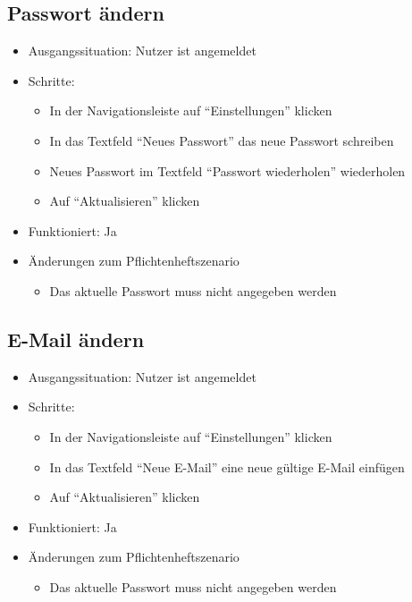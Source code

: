 \documentclass[a4paper]{scrreprt}
\begin{document}
            \subsection{Passwort ändern}
            \begin{itemize}
                \item Ausgangssituation: Nutzer ist angemeldet
                \item Schritte:
                    \begin{itemize}
                        \item In der Navigationsleiste auf \enquote{Einstellungen} klicken
                        \item In das Textfeld \enquote{Neues Passwort} das neue Passwort schreiben
                        \item Neues Passwort im Textfeld \enquote{Passwort wiederholen} wiederholen
                        \item Auf \enquote{Aktualisieren} klicken
                    \end{itemize}
                \item Funktioniert: Ja
                \item Änderungen zum Pflichtenheftszenario
                \begin{itemize}
                    \item Das aktuelle Passwort muss nicht angegeben werden
                \end{itemize}
            \end{itemize}

            \subsection{E-Mail ändern}
            \begin{itemize}
                \item Ausgangssituation: Nutzer ist angemeldet
                \item Schritte:
                    \begin{itemize}
                        \item In der Navigationsleiste auf \enquote{Einstellungen} klicken
                        \item In das Textfeld \enquote{Neue E-Mail} eine neue gültige E-Mail einfügen
                        \item Auf \enquote{Aktualisieren} klicken
                    \end{itemize}
                \item Funktioniert: Ja
                \item Änderungen zum Pflichtenheftszenario
                    \begin{itemize}
                        \item Das aktuelle Passwort muss nicht angegeben werden
                    \end{itemize}
            \end{itemize}
\end{document}

